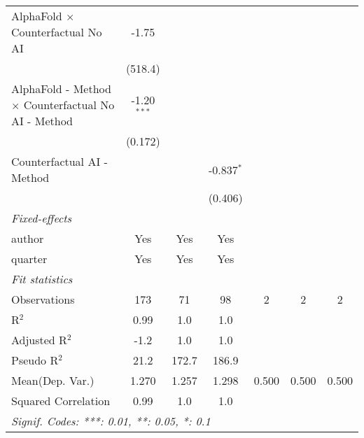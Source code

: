 \begin{tabular}{lcccccc}
   AlphaFold $\times$ Counterfactual No AI                    & -1.75         &               &                &     &     &   \\   
                                                              & (518.4)       &               &                &     &     &   \\   
   AlphaFold - Method $\times$ Counterfactual No AI - Method  & -1.20$^{***}$ &               &                &     &     &   \\   
                                                              & (0.172)       &               &                &     &     &   \\   
   Counterfactual AI - Method                                 &               &               & -0.837$^{*}$   &     &     &   \\   
                                                              &               &               & (0.406)        &     &     &   \\   
   \midrule
   \emph{Fixed-effects}\\
   author                                                     & Yes           & Yes           & Yes            &     &     & \\  
   quarter                                                    & Yes           & Yes           & Yes            &     &     & \\  
   \midrule
   \emph{Fit statistics}\\
   Observations                                               & 173           & 71            & 98             & 2   & 2   & 2\\  
   R$^2$                                                      & 0.99          & 1.0           & 1.0            &     &     & \\  
   Adjusted R$^2$                                             & -1.2          & 1.0           & 1.0            &     &     & \\  
   Pseudo R$^2$                                               & 21.2          & 172.7         & 186.9          &     &     & \\  
Mean(Dep. Var.) & 1.270 & 1.257 & 1.298 & 0.500 & 0.500 & 0.500 \\
   Squared Correlation                                        & 0.99          & 1.0           & 1.0            &     &     & \\  
   \midrule \midrule
   \multicolumn{7}{l}{\emph{Signif. Codes: ***: 0.01, **: 0.05, *: 0.1}}\\
\end{tabular}
\par\endgroup

